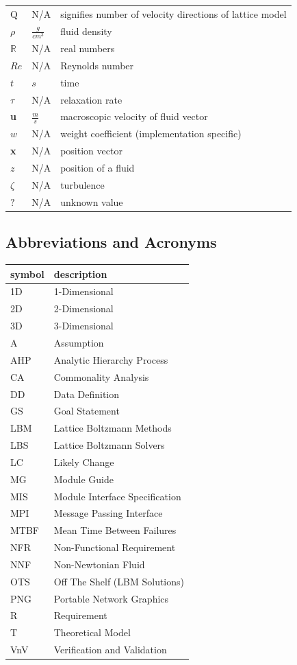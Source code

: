 \documentclass[12pt]{article}
\begin{document}
\begin{longtable*}{l l p{12cm}}
\\
$\mathrm{Q}$ & N/A & signifies number of velocity directions of lattice model
\\
$\rho$ & $\frac{g}{cm^3}$ & fluid density
\\
$\mathbb{R}$ & N/A & real numbers
\\
$Re$ & N/A & Reynolds number
\\
$t$ & $s$ & time
\\
$\tau$ & N/A & relaxation rate
\\
\textbf{u} & $\frac{m}{s}$ & macroscopic velocity of fluid vector
\\
$w$ & N/A & weight coefficient (implementation specific)
\\
\textbf{x} & N/A & position vector
\\
$z$ & N/A & position of a fluid
\\
$\zeta$ & N/A & turbulence
\\
$?$ & N/A & unknown value 
\\
\bottomrule
\end{longtable*}

\subsection{Abbreviations and Acronyms}
\label{CAABBACR}

\renewcommand{\arraystretch}{1.2}
\begin{tabular}{l l} 
  \toprule		
  \textbf{symbol} & \textbf{description}\\
  \midrule
  1D & 1-Dimensional\\ 
  2D & 2-Dimensional\\ 
  3D & 3-Dimensional\\ 
  A & Assumption\\
  AHP & Analytic Hierarchy Process\\
  CA & Commonality Analysis\\
  DD & Data Definition\\
  GS & Goal Statement\\
  LBM & Lattice Boltzmann Methods\\
  LBS & Lattice Boltzmann Solvers\\
  LC & Likely Change\\
  MG & Module Guide\\
  MIS & Module Interface Specification\\
  MPI & Message Passing Interface\\
  MTBF & Mean Time Between Failures\\
  NFR & Non-Functional Requirement\\
  NNF & Non-Newtonian Fluid\\
  OTS & Off The Shelf (LBM Solutions)\\
  PNG & Portable Network Graphics\\
  R & Requirement\\
  T & Theoretical Model\\
  VnV & Verification and Validation\\
  \bottomrule
\end{tabular}\\
\end{document}
